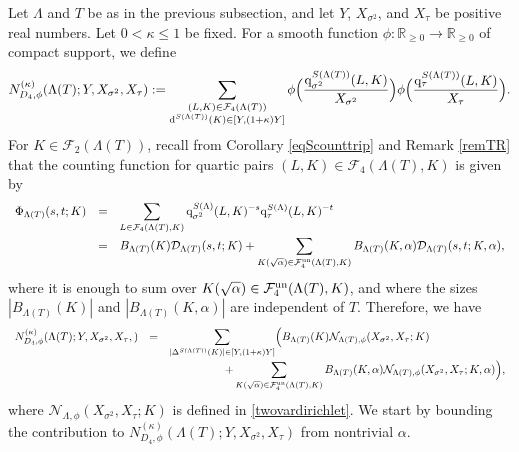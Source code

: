 \documentclass[10pt]{article}
\theoremstyle{plain}
\theoremstyle{definition}
\theoremstyle{remark}
\def\un{{\rm un}}
\def\R{{\mathbb R}}
\def\FF{{\mathcal F}}
\def\cD{{\mathcal D}}
\def\cN{{\mathcal N}}
\newcommand{\D}{{\rm d}}
\newcommand{\q}{{\rm q}}
\begin{document}
Let $\Lambda$ and $T$ be as in the previous subsection, and let $Y$,
$X_{\sigma^2}$, and $X_\tau$ be positive real numbers. Let
$0<\kappa\leq 1$ be fixed. For a
smooth function $\phi:\R_{\geq 0}\to \R_{\geq 0}$ of compact support,
we define
\begin{equation*}
N_{D_4,\phi}^{(\kappa)}(\Lambda(T);Y,X_{\sigma^2},X_\tau):=
\sum_{\substack{(L,K)\in\FF_{4}(\Lambda(T))\\\D^{S(\Lambda(T))}(K)\in[Y,(1+\kappa)Y]}}
\phi\Bigl(\frac{\q_{\sigma^2}^{S(\Lambda(T))}(L,K)}{X_{\sigma^2}}\Bigr)
\phi\Bigl(\frac{\q_{\tau}^{S(\Lambda(T))}(L,K)}{X_{\tau}}\Bigr).
\end{equation*}
For $K\in \FF_2(\Lambda(T))$, recall from Corollary \ref{eqScounttrip}
and Remark \ref{remTR} that the counting function for quartic pairs
$(L,K)\in\FF_4(\Lambda(T),K)$ is given by
\begin{equation*}
\begin{array}{rcl}
\Phi_{\Lambda(T)}(s,t;K)&=&\displaystyle
\sum_{L\in\FF_4(\Lambda(T),K)}\q_{\sigma^2}^{S(\Lambda)}(L,K)^{-s}
\q_{\tau}^{S(\Lambda)}(L,K)^{-t}\\[.2in]&=&\displaystyle
B_{\Lambda(T)}(K)\cD_{\Lambda(T)}(s,t;K)+\sum_{K(\sqrt{\alpha})\in\FF_4^\un(\Lambda(T),K)}
B_{\Lambda(T)}(K,\alpha)\cD_{\Lambda(T)}(s,t;K,\alpha),
\end{array}
\end{equation*}
where it is enough to sum over $K(\sqrt{\alpha})\in\FF_4^\un(\Lambda(T),K)$, and
where the sizes $|B_{\Lambda(T)}(K)|$ and $|B_{\Lambda(T)}(K,\alpha)|$
are independent of $T$. Therefore, we have
\begin{equation}\label{eqMBcotemp}
\begin{array}{rcl}
\displaystyle N_{D_4,\phi}^{(\kappa)}(\Lambda(T);Y,X_{\sigma^2},X_\tau,)&=&\displaystyle
\sum_{|\Delta^{S(\Lambda(T))}(K)|\in[Y,(1+\kappa)Y]}\Bigl(B_{\Lambda(T)}(K)\cN_{\Lambda(T),\phi}(X_{\sigma^2},X_\tau;K)
\\[.2in]&&\displaystyle
\qquad \qquad \quad+\sum_{K(\sqrt{\alpha})\in\FF_4^\un(\Lambda(T),K)}B_{\Lambda(T)}(K,\alpha)\cN_{\Lambda(T),\phi}(X_{\sigma^2},X_\tau;K,\alpha)\Bigr),
\end{array}
\end{equation}
where $\cN_{\Lambda,\phi}(X_{\sigma^2},X_{\tau};K)$ is defined in \eqref{twovardirichlet}.
We start by bounding the contribution to
$N_{D_4,\phi}^{(\kappa)}(\Lambda(T);Y,X_{\sigma^2},X_\tau)$ from
nontrivial $\alpha$.
\end{document}
